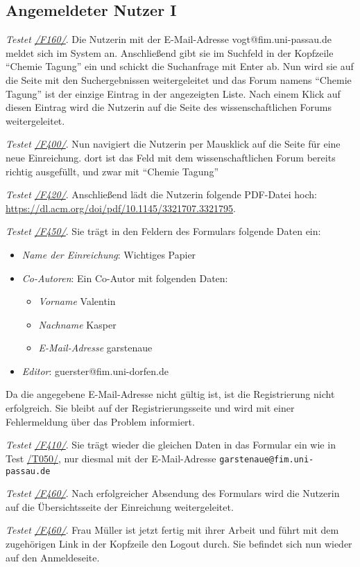 \subsection{Angemeldeter Nutzer I}
\begin{description}

	 \emph{Testet \hyperref[funkt:160]{/F160/}}.
	Die Nutzerin mit der E-Mail-Adresse vogt@fim.uni-passau.de meldet sich im System an.
	Anschließend gibt sie im Suchfeld in der Kopfzeile ``Chemie Tagung'' ein und schickt die Suchanfrage mit Enter ab.
	Nun wird sie auf die Seite mit den Suchergebnissen weitergeleitet und das Forum namens ``Chemie Tagung'' ist der einzige Eintrag in der angezeigten Liste.
	Nach einem Klick auf diesen Eintrag wird die Nutzerin auf die Seite des wissenschaftlichen Forums weitergeleitet.

	 \emph{Testet \hyperref[funkt:400]{/F400/}}.
	Nun navigiert die Nutzerin per Mausklick auf die Seite für eine neue Einreichung.
	dort ist das Feld mit dem wissenschaftlichen Forum bereits richtig ausgefüllt, und zwar mit ``Chemie Tagung''

	 \emph{Testet \hyperref[funkt:420]{/F420/}}.
	Anschließend lädt die Nutzerin folgende PDF-Datei hoch: \href{https://dl.acm.org/doi/pdf/10.1145/3321707.3321795}{https://dl.acm.org/doi/pdf/10.1145/3321707.3321795}.

	 \emph{Testet \hyperref[funkt:450]{/F450/}}.
	Sie trägt in den Feldern des Formulars folgende Daten ein:
	\begin{itemize}
		\item \emph{Name der Einreichung}: Wichtiges Papier
		\item \emph{Co-Autoren}: Ein Co-Autor mit folgenden Daten:
		\begin{itemize}
			\item \emph{Vorname} Valentin
			\item \emph{Nachname} Kasper
			\item \emph{E-Mail-Adresse} garstenaue
		\end{itemize}
		\item \emph{Editor}: guerster@fim.uni-dorfen.de
	\end{itemize}
	Da die angegebene E-Mail-Adresse nicht gültig ist, ist die Registrierung nicht erfolgreich.
	Sie bleibt auf der Registrierungsseite und wird mit einer Fehlermeldung über das Problem informiert.

	 \emph{Testet \hyperref[funkt:410]{/F410/}}.
	Sie trägt wieder die gleichen Daten in das Formular ein wie in Test \hyperref[t050]{/T050/}, nur diesmal mit der E-Mail-Adresse \texttt{garstenaue@fim.uni-passau.de}

	 \emph{Testet \hyperref[funkt:460]{/F460/}}.
	Nach erfolgreicher Absendung des Formulars wird die Nutzerin auf die Übersichtsseite der Einreichung weitergeleitet.

	 \emph{Testet \hyperref[funkt:460]{/F460/}}.
	Frau Müller ist jetzt fertig mit ihrer Arbeit und führt mit dem zugehörigen Link in der Kopfzeile den Logout durch.
	Sie befindet sich nun wieder auf den Anmeldeseite.
\end{description}

